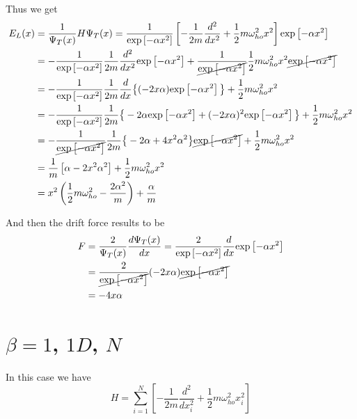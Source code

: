 \documentclass{article}
\begin{document}
Thus we get
\begin{align*}
    E_L(x) &= \frac{1}{\Psi_T(x)}H\Psi_T(x) = \frac{1}{\text{exp}\left[-\alpha x^2\right]}  \left[ -\frac{1}{2m} \frac{d^2}{dx^2} + \frac{1}{2} m \omega_{ho}^2 x^2 \right] \text{exp}\left[-\alpha x^2\right] \\
    &= -\frac{1}{\text{exp}\left[-\alpha x^2\right]}  \frac{1}{2m} \frac{d^2}{dx^2}\text{exp}\left[-\alpha x^2\right]  + \frac{1}{\cancel{\text{exp}\left[-\alpha x^2\right]}}  \frac{1}{2} m \omega_{ho}^2 x^2  \cancel{\text{exp}\left[-\alpha x^2\right] } \\
    &= -\frac{1}{\text{exp}\left[-\alpha x^2\right]}  \frac{1}{2m} \frac{d}{dx} \big\{ (-2 x \alpha) \text{exp} \left[-\alpha x^2\right] \big\} + \frac{1}{2} m \omega_{ho}^2 x^2  \\
    &= -\frac{1}{\text{exp}\left[-\alpha x^2\right]}  \frac{1}{2m} \big\{-2 \alpha \text{exp} \left[-\alpha x^2\right] + (-2x\alpha)^2 \text{exp} \left[-\alpha x^2\right] \big\} + \frac{1}{2} m \omega_{ho}^2 x^2 \\
    &= -\frac{1}{\cancel{\text{exp}\left[-\alpha x^2\right]}}  \frac{1}{2m} \big\{-2 \alpha  + 4x^2\alpha^2 \big\} \cancel{\text{exp} \left[-\alpha x^2\right]} + \frac{1}{2} m \omega_{ho}^2 x^2 \\
    &= \frac{1}{m} \left[ \alpha - 2x^2\alpha^2 \right] + \frac{1}{2} m \omega_{ho}^2 x^2 \\ 
    &= x^2 \left( \frac{1}{2} m \omega_{ho}^2 - \frac{2\alpha^2}{m} \right) + \frac{\alpha}{m}
\end{align*}


And then the drift force results to be
\begin{align*}
    F &= \frac{2}{\Psi_T(x)} \frac{d\Psi_T(x)}{dx} = \frac{2}{\text{exp}\left[-\alpha x^2\right]} \frac{d}{dx} \text{exp}\left[-\alpha x^2\right] \\
    &= \frac{2}{\cancel{\text{exp}\left[-\alpha x^2\right]}} (-2x\alpha) \cancel{\text{exp}\left[-\alpha x^2\right]} \\
    &= -4x\alpha
\end{align*}



\section{$\beta = 1$, $1D$, $N$}

In this case we have
\begin{equation*}
     H = \sum_{i=1}^N \left[ -\frac{1}{2m} \frac{d^2}{dx_i^2} + \frac{1}{2} m \omega_{ho}^2 x_i^2 \right]
\end{equation*}
\end{document}
